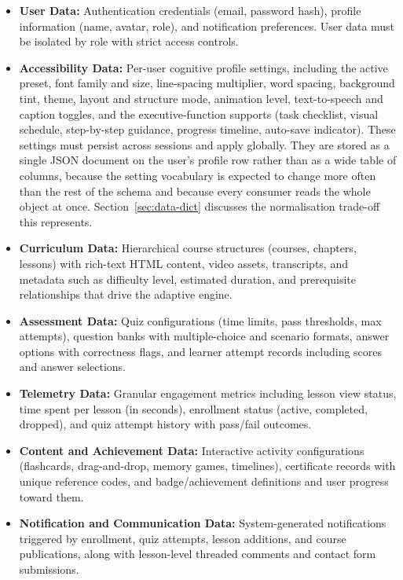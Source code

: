 \documentclass[12pt, oneside]{article} %
\begin{document}
\begin{itemize}
    \item \textbf{User Data:} Authentication credentials (email, password hash), profile information (name, avatar, role), and notification preferences. User data must be isolated by role with strict access controls.
    \item \textbf{Accessibility Data:} Per-user cognitive profile settings, including the active preset, font family and size, line-spacing multiplier, word spacing, background tint, theme, layout and structure mode, animation level, text-to-speech and caption toggles, and the executive-function supports (task checklist, visual schedule, step-by-step guidance, progress timeline, auto-save indicator). These settings must persist across sessions and apply globally. They are stored as a single JSON document on the user's profile row rather than as a wide table of columns, because the setting vocabulary is expected to change more often than the rest of the schema and because every consumer reads the whole object at once. Section~\ref{sec:data-dict} discusses the normalisation trade-off this represents.
    \item \textbf{Curriculum Data:} Hierarchical course structures (courses, chapters, lessons) with rich-text HTML content, video assets, transcripts, and metadata such as difficulty level, estimated duration, and prerequisite relationships that drive the adaptive engine.
    \item \textbf{Assessment Data:} Quiz configurations (time limits, pass thresholds, max attempts), question banks with multiple-choice and scenario formats, answer options with correctness flags, and learner attempt records including scores and answer selections.
    \item \textbf{Telemetry Data:} Granular engagement metrics including lesson view status, time spent per lesson (in seconds), enrollment status (active, completed, dropped), and quiz attempt history with pass/fail outcomes.
    \item \textbf{Content and Achievement Data:} Interactive activity configurations (flashcards, drag-and-drop, memory games, timelines), certificate records with unique reference codes, and badge/achievement definitions and user progress toward them.
    \item \textbf{Notification and Communication Data:} System-generated notifications triggered by enrollment, quiz attempts, lesson additions, and course publications, along with lesson-level threaded comments and contact form submissions.
\end{itemize}
\end{document}
